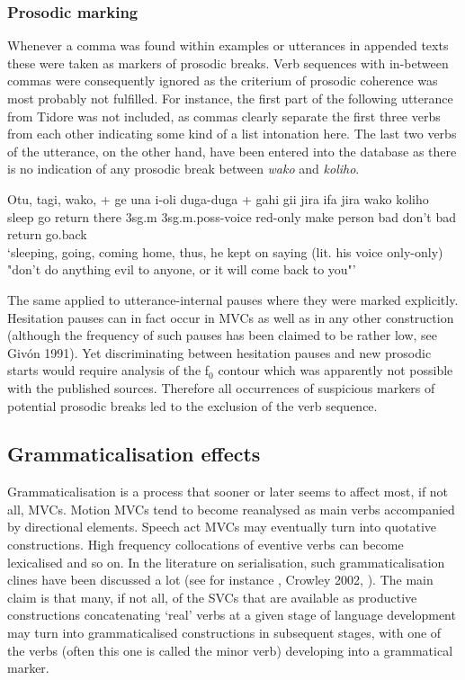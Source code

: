 \subsubsection{Prosodic marking}

Whenever a comma was found within examples or utterances in appended texts these were taken as markers of prosodic breaks. Verb sequences with in-between commas were consequently ignored as the criterium of prosodic coherence was most probably not fulfilled. For instance, the first part of the following utterance from Tidore was not included, as commas clearly separate the first three verbs from each other indicating some kind of a list intonation here. The last two verbs of the utterance, on the other hand, have been entered into the database as there is no indication of any prosodic break between \textit{wako} and \textit{koliho}.

\ea \label{}
\gll Otu, tagi, wako, + ge una i-oli duga-duga + gahi gii jira ifa jira wako koliho \\
sleep go return there 3\acs{sg}.\acs{m} 3\acs{sg}.\acs{m}.\acs{poss}-voice \acs{red}-only make person bad don't bad return go.back \\
\glft `sleeping, going, coming home, thus, he kept on saying (lit. his voice only-only) "don’t
do anything evil to anyone, or it will come back to you"’ \\ 
\z
\xe

The same applied to utterance-internal pauses where they were marked explicitly. Hesitation pauses can in fact occur in MVCs as well as in any other construction (although the frequency of such pauses has been claimed to be rather low, see Givón 1991). Yet discriminating between hesitation pauses and new prosodic starts would require analysis of the f$_0$ contour which was apparently not possible with the published sources. Therefore all occurrences of suspicious markers of potential prosodic breaks led to the exclusion of the verb sequence.

\subsection{Grammaticalisation effects} \label{sec:grammaticalisation}

Grammaticalisation is a process that sooner or later seems to affect most, if not all, MVCs. Motion MVCs tend to become reanalysed as main verbs accompanied by directional elements. Speech act MVCs may eventually turn into quotative constructions. High frequency collocations of eventive verbs can become lexicalised and so on. In the literature on serialisation, such grammaticalisation clines have been discussed a lot (see for instance \cite{lord1993historical}, Crowley 2002, \cite{bowern2008diachrony}). The main claim is that many, if not all, of the SVCs that are available as productive constructions concatenating `real' verbs at a given stage of language development may turn into grammaticalised constructions in subsequent stages, with one of the verbs (often this one is called the minor verb) developing into a grammatical marker. 

